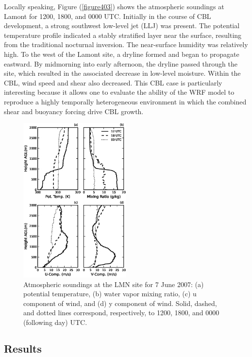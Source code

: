 Locally speaking, Figure (\autoref{figure403}) shows the atmospheric soundings at Lamont for 1200, 1800, and 0000 UTC. Initially in the course of CBL development, a strong southwest low-level jet (LLJ) was present. The potential temperature profile indicated a stably stratified layer near the surface, resulting from the traditional nocturnal inversion. The near-surface humidity was relatively high. To the west of the Lamont site, a dryline formed and began to propagate eastward. By midmorning into early afternoon, the dryline passed through the site, which resulted in the associated decrease in low-level moisture. Within the CBL, wind speed and shear also decreased. This CBL case is particularly interesting because it allows one to evaluate the ability of the WRF model to reproduce a highly temporally heterogeneous environment in which the combined shear and buoyancy forcing drive CBL growth.


\begin{figure}[H]
\begin{center}
\includegraphics[width=0.5\textwidth]{figures/chapter4/20070607_lmnsounding}
\end{center}
\caption{Atmospheric soundings at the LMN site for 7 June 2007: (a) potential temperature, (b) water vapor mixing ratio, (c) u component of wind, and (d) y component of wind. Solid, dashed, and dotted lines correspond, respectively, to 1200, 1800, and 0000 (following day) UTC.}
\label{figure403}
\end{figure}


\subsection{Results}
\label{res-432}

